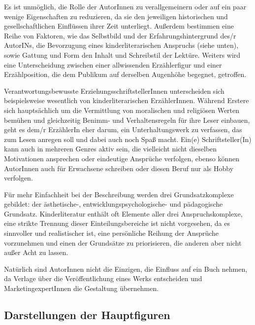     Es ist unmöglich, die Rolle der AutorInnen zu verallgemeinern oder auf ein
    paar wenige Eigenschaften zu reduzieren, da sie den jeweiligen historischen
    und gesellschaftlichen Einflüssen ihrer Zeit unterliegt. Außerdem bestimmen
    eine Reihe von Faktoren, wie das Selbstbild und der Erfahrungshintergrund
    des/r AutorINs, die Bevorzugung eines kinderliterarischen Anspruchs (siehe
    unten), sowie Gattung und Form den Inhalt und Schreibstil der Lektüre.
    Weiters wird eine Unterscheidung zwischen einer allwissenden Erzählerfigur
    und einer Erzählposition, die dem Publikum auf derselben Augenhöhe begegnet,
    getroffen.

    Verantwortungsbewusste ErziehungsschriftstellerInnen unterscheiden sich
    beispielsweise wesentlich von kinderliterarischen ErzählerInnen. Während
    Erstere sich hauptsächlich um die Vermittlung von moralischen und religiösen
    Werten bemühen und gleichzeitig Benimm- und Verhaltensregeln für ihre Leser
    einbauen, geht es dem/r ErzählerIn eher darum, ein Unterhaltungswerk zu
    verfassen, das zum Lesen anregen soll und dabei auch noch Spaß macht.
    Ein(e) Schriftsteller(In) kann auch in mehreren Genres aktiv sein, die
    vielleicht nicht dieselben Motivationen ansprechen  oder eindeutige
    Ansprüche verfolgen, ebenso können AutorInnen auch für Erwachsene schreiben
    oder diesen Beruf nur als Hobby verfolgen.

    Für mehr Einfachheit bei der Beschreibung werden drei Grundsatzkomplexe
    gebildet: der ästhetische-, entwicklungspsychologische- und pädagogische
    Grundsatz. Kinderliteratur enthält oft Elemente aller drei
    Anspruchskomplexe, eine strikte Trennung dieser Einteilungsbereiche ist
    nicht vorgesehen, da es sinnvoller und realistischer ist, eine persönliche
    Reihung der Ansprüche vorzunehmen  und einen der Grundsätze zu priorisieren,
    die anderen aber nicht außer Acht zu lassen.

    Natürlich sind AutorInnen nicht die Einzigen, die Einfluss auf ein Buch
    nehmen, da Verlage über die Veröffentlichung eines Werks entscheiden und
    MarketingexpertInnen die Gestaltung übernehmen.

  \subsection{Darstellungen der Hauptfiguren}

